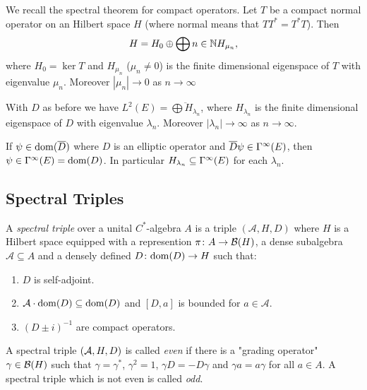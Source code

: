 \begin{remark}
 We recall the spectral theorem for compact operators. Let $T$ be a compact normal operator on an Hilbert space $H$ (where normal means that $TT^\ast=T^\ast T$). Then $$H=H_0\oplus\bigoplus{n\in\mathbb{N}}H_{\mu_n},$$
 where $H_0=\ker T$ and $H_{\mu_n}$ ($\mu_n\neq 0$) is the finite dimensional eigenspace of $T$ with eigenvalue $\mu_n$. Moreover $|\mu_n|\to 0$ as $n\to\infty$ 
\end{remark}
\begin{corollary}
 With $D$ as before  we have $L^2(E)=\overline{\bigoplus H_{\lambda_n}}$, where $H_{\lambda_n}$ is the finite dimensional eigenspace of $D$ with eigenvalue $\lambda_n$. Moreover $|\lambda_n|\to\infty$ as $n\to\infty$.
\end{corollary}
\begin{theorem} If $\psi\in\mathrm{dom}(\overline{D})$ where $D$ is an elliptic operator and $\overline{D}\psi\in\Gamma^\infty(E)$, then $\psi\in\Gamma^\infty(E)=\mathrm{dom}(D)$. In particular $H_{\lambda_n}\subseteq\Gamma^\infty(E)$ for each $\lambda_n$.
\end{theorem}
\subsection{Spectral Triples}
\begin{definition}
 A \emph{spectral triple} over a unital $C^\ast$-algebra $A$ is a triple $(\mathcal A,H,D)$ where $H$ is a Hilbert space equipped with a represention $\pi\colon A\to\mathcal{B}(H)$, a dense subalgebra $\mathcal A\subseteq A$ and a densely defined $D\colon\mathrm{dom}(D)\to H$ such that: 
 \begin{enumerate}
  \item $D$ is self-adjoint.
  \item $\mathcal A\cdot\mathrm{dom}(D)\subseteq\mathrm{dom}(D)$ and $[D,a]$ is bounded for $a\in\mathcal A$.
  \item $(D\pm i)^{-1}$ are compact operators.
 \end{enumerate}
\end{definition}

\begin{definition}
 A spectral triple $(\mathcal{A},H,D)$ is called \emph{even} if there is a "grading operator" $\gamma\in\mathcal{B}(H)$ such that $\gamma=\gamma^\ast$, $\gamma^2=1$, $\gamma D=-D\gamma$ and $\gamma a =a\gamma$ for all $a\in A$. A spectral triple which is not even is called \emph{odd}.
\end{definition}

